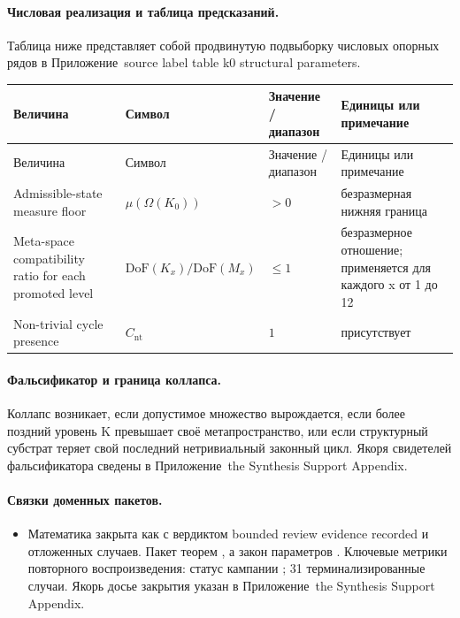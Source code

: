 \paragraph{Числовая реализация и таблица предсказаний.}
Таблица ниже представляет собой продвинутую подвыборку числовых опорных рядов в Приложение~source label table k0 structural parameters.
\begin{longtable}{@{}L{0.27\textwidth}L{0.15\textwidth}L{0.24\textwidth}L{0.16\textwidth}@{}}
\toprule
Величина & Символ & Значение / диапазон & Единицы или примечание \\
\midrule
\endfirsthead
\toprule
Величина & Символ & Значение / диапазон & Единицы или примечание \\
\midrule
\endhead
Admissible-state measure floor & $\scriptstyle \mu(\Omega(K_0))$ & $> 0$ & безразмерная нижняя граница \\
Meta-space compatibility ratio for each promoted level & $\scriptstyle \mathrm{DoF}(K_x)/\allowbreak \mathrm{DoF}(M_x)$ & $\leq 1$ & безразмерное отношение; применяется для каждого x от 1 до 12 \\
Non-trivial cycle presence & $\scriptstyle C_{\mathrm{nt}}$ & $1$ & присутствует \\
\bottomrule
\end{longtable}

\paragraph{Фальсификатор и граница коллапса.}
Коллапс возникает, если допустимое множество вырождается, если более поздний уровень K превышает своё метапространство, или если структурный субстрат теряет свой последний нетривиальный законный цикл.
Якоря свидетелей фальсификатора сведены в Приложение~the Synthesis Support Appendix.

\paragraph{Связки доменных пакетов.}
\begin{itemize}[leftmargin=1.6em,nosep]
\item Математика закрыта как  с вердиктом bounded review evidence recorded и  отложенных случаев. Пакет теорем , а закон параметров . Ключевые метрики повторного воспроизведения: статус кампании ; 31 терминализированные случаи. Якорь досье закрытия указан в Приложение~the Synthesis Support Appendix.
\end{itemize}


